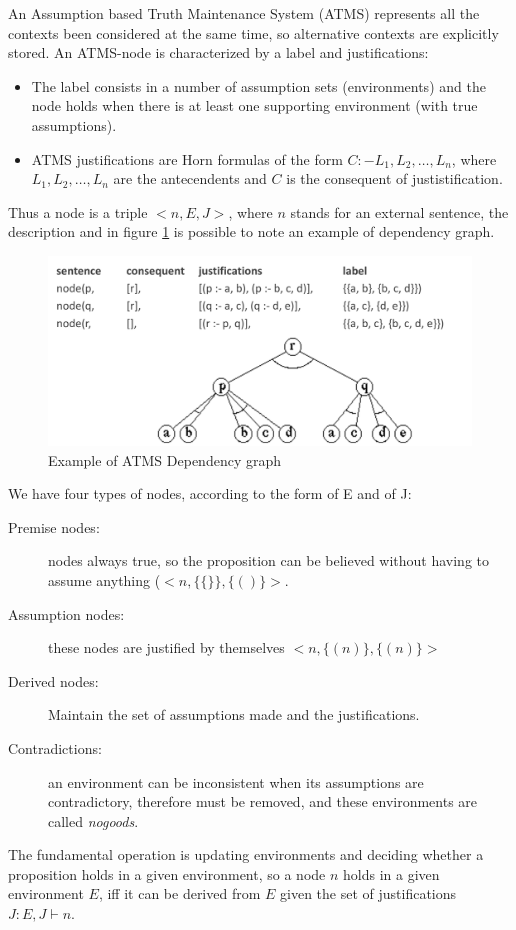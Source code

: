 An Assumption based Truth Maintenance System (ATMS) represents all the contexts
been considered at the same time, so alternative contexts are explicitly stored.\newline
An ATMS-node is characterized by a label and justifications:
\begin{itemize}
 \item The label consists in a number of assumption sets (environments) and 
       the node holds when there is at least one supporting environment
       (with true assumptions).
 \item ATMS justifications are Horn formulas of the form $C :- L_1, L_2, \dots, L_n$,
       where $L_1, L_2, \dots, L_n$ are the antecendents and $C$ is the consequent of 
       justistification.
\end{itemize}
Thus a node is a triple $<n, E, J>$, where $n$ stands for an external sentence,
the description and in figure \ref{img:dependencyGraph} is possible to note an 
example of dependency graph.

\begin{figure}
	\includegraphics[width=\textwidth]{Images/dependencyGraph}
	\caption{Example of ATMS Dependency graph}
	\label{img:dependencyGraph}
\end{figure}

We have four types of nodes, according to the form of E and of J:
\begin{description}
 \item [Premise nodes: ] nodes always true, so the proposition can be believed
	                 without having to assume anything ($<n, \{\{ \}\}, \{( )\}>$.
 \item [Assumption nodes: ] these nodes are justified by themselves $<n, \{(n)\},\{(n)\}>$
 \item [Derived nodes: ] Maintain the set of assumptions made and the justifications.
 \item [Contradictions: ] an environment can be inconsistent when its assumptions are
	 contradictory, therefore must be removed, and these environments
	 are called \emph{nogoods}.
\end{description}
The fundamental operation is updating environments and deciding whether a
proposition holds in a given environment, so a node $n$ holds in a given 
environment $E$, iff it can be derived from $E$ given 
the set of justifications $J: E, J \vdash n$.

